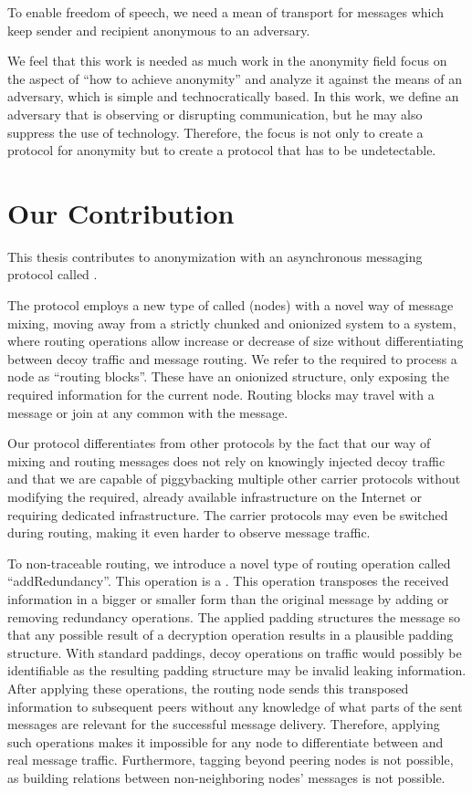 To enable freedom of speech, we need a mean of transport for messages which keep sender and recipient anonymous to an adversary.

We feel that this work is needed as much work in the anonymity field focus on the aspect of ``how to achieve anonymity'' and analyze it against the means of an adversary, which is simple and technocratically based. In this work, we define an adversary that is observing or disrupting communication, but he may also suppress the use of technology. Therefore, the focus is not only to create a protocol for anonymity but to create a protocol that has to be undetectable.

\chapter{Our Contribution}
This thesis contributes to anonymization with an asynchronous messaging protocol called \MessageVortex.

The protocol employs a new type of  called \VortexNodes{} (nodes) with a novel way of message mixing, moving away from a strictly chunked and onionized system to a system, where routing operations allow increase or decrease of size without differentiating between decoy traffic and message routing. We refer to the  required to process a node as ``routing blocks''. These  have an onionized structure, only exposing the required information for the current node. Routing blocks may travel with a message or join at any common \VortexNode with the message.

Our protocol differentiates from other protocols by the fact that our way of mixing and routing messages does not rely on knowingly injected decoy traffic and that we are capable of piggybacking multiple other carrier protocols without modifying the required, already available infrastructure on the Internet or requiring dedicated infrastructure. The carrier protocols may even be switched during routing, making it even harder to observe message traffic. 

To non-traceable routing, we introduce a novel type of routing operation called ``add\-Redundancy''. This operation is a  . This operation transposes the received information in a bigger or smaller form than the original message by adding or removing redundancy operations. The applied padding structures the message so that any possible result of a decryption operation results in a plausible padding structure. With standard paddings, decoy operations on traffic would possibly be identifiable as the resulting padding structure may be invalid leaking information. After applying these operations, the routing node sends this transposed information to subsequent peers without any knowledge of what parts of the sent messages are relevant for the successful message delivery. Therefore, applying such operations makes it impossible for any node to differentiate between  and real message traffic. Furthermore, tagging beyond peering nodes is not possible, as building relations between non-neighboring nodes' messages is not possible.

